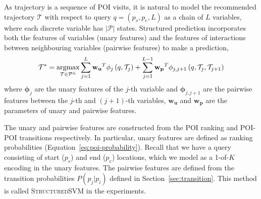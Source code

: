 As trajectory is a sequence of POI visits,
it is natural to model the recommended trajectory $\mathcal{T}$ with respect to query $q = (p_s, p_e, L)$
as a chain of $L$ variables, where each discrete variable has $|\mathcal{P}|$ states.
Structured prediction incorporates both the features of variables (unary features) and
the features of interactions between neighbouring variables (pairwise features) to make a
prediction,
\begin{displaymath}
    \mathcal{T}^* = \operatorname*{argmax}_{\mathcal{T} \in \mathcal{P}^L} 
                    \sum_{j=1}^L \mathbf{w_u}^T \mathbf{\phi}_j \left( q, \mathcal{T}_j \right) +
                    \sum_{j=1}^{L-1} \mathbf{w_p}^T \mathbf{\phi}_{j, j+1} \left( q, \mathcal{T}_j, \mathcal{T}_{j+1} \right)
\end{displaymath}
where $\mathbf{\phi}_j$ are the unary features of the $j$-th variable and $\mathbf{\phi}_{j, j+1}$ are the pairwise features between
the $j$-th and $(j+1)$-th variables, $\mathbf{w_u}$ and $\mathbf{w_p}$ are the
parameters of unary and pairwise features.

The unary and pairwise features are constructed from the POI ranking and POI-POI transitions respectively.
In particular, unary features are defined as ranking probabilities (Equation~\ref{eq:poi-probability}).
Recall that we have a query consisting of start ($p_s$) and end ($p_e$) locations, which
we model as a 1-of-$K$ encoding in the unary features.
The pairwise features are defined from the transition probabilities $P(p_j | p_i)$ defined in
Section~\ref{sec:transition}.
This method is called \textsc{StructuredSVM} in the experiments.

